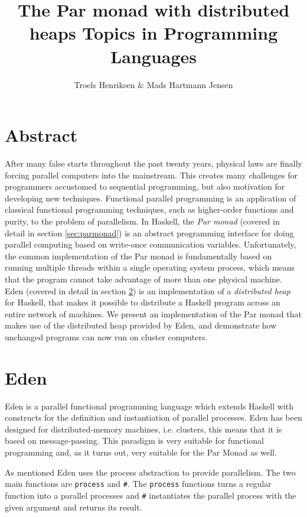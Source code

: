 \documentclass[a4paper, oneside, final]{memoir}
\title{The Par monad with distributed heaps \newline \large{Topics in Programming Languages}}
\author{Troels Henriksen \& Mads Hartmann Jensen}
\begin{document}
\maketitle

\section{Abstract}

After many false starts throughout the past twenty years, physical
laws are finally forcing parallel computers into the mainstream.  This
creates many challenges for programmers accustomed to sequential
programming, but also motivation for developing new techniques.
Functional parallel programming is an application of classical
functional programming techniques, such as higher-order functions and
purity, to the problem of parallelism.  In Haskell, the \textit{Par
  monad} (covered in detail in section \ref{sec:parmonad}) is an
abstract programming interface for doing parallel computing based on
write-once communication variables.  Unfortunately, the common
implementation of the Par monad is fundamentally based on running
multiple threads within a single operating system process, which means
that the program cannot take advantage of more than one physical
machine.  Eden (covered in detail in section \ref{sec:eden}) is an
implementation of a \textit{distributed heap} for Haskell, that makes
it possible to distribute a Haskell program across an entire network
of machines.  We present an implementation of the Par monad that makes
use of the distributed heap provided by Eden, and demonstrate how
unchanged programs can now run on cluster computers.

\newpage 

\section{Eden}
\label{sec:eden}

Eden is a parallel functional programming language which extends
Haskell with constructs for the definition and instantiation of
parallel processes. Eden has been designed for distributed-memory
machines, i.e. clusters, this means that it is based on 
message-passing. This paradigm is very suitable for functional
programming and, as it turns out, very suitable for the Par Monad
as well. 

As mentioned Eden uses the process abstraction to provide parallelism.
The two main functions are \texttt{process} and \texttt{\#}. The
\texttt{process} functions turns a regular function into a parallel
processes and \texttt{\#} instantiates the parallel process with the
given argument and returns its result. \newline 
\end{document}
